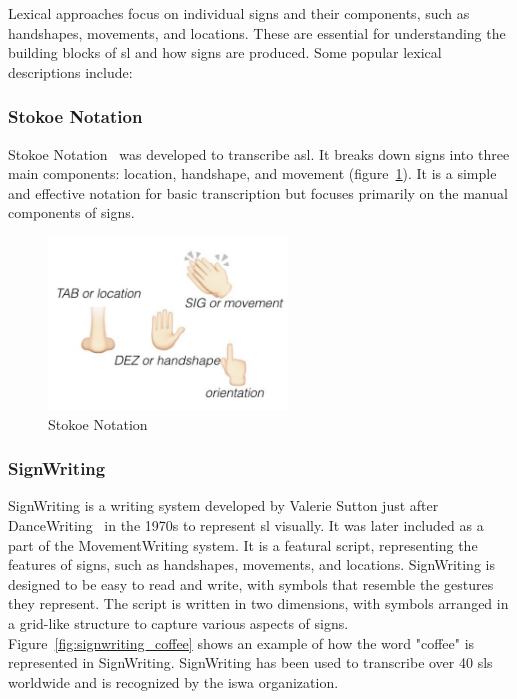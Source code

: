 \documentclass[../../main.tex]{subfiles}
\begin{document}
Lexical approaches focus on individual signs and their components, such as handshapes, movements, and locations. These are essential for understanding the building blocks of \gls{sl} and how signs are produced. Some popular lexical descriptions include:

\subsubsection{Stokoe Notation}
\label{ch:background_work:sign_language_descriptions:lexical_approaches:stokoe_notation}

Stokoe Notation~\cite{stokoe1980sign} was developed to transcribe \gls{asl}. It breaks down signs into three main components: location, handshape, and movement (figure~\ref{fig:stokoe}). It is a simple and effective notation for basic transcription but focuses primarily on the manual components of signs.

\begin{figure}[h]
  \centering \includegraphics[width = 2.5in]{chapters/background_work/images/stokoe.png}
  \caption{Stokoe Notation}
  \label{fig:stokoe}
\end{figure}

\subsubsection{SignWriting}
\label{ch:background_work:sign_language_descriptions:lexical_approaches:signwriting}

SignWriting is a writing system developed by Valerie Sutton just after DanceWriting~\cite{sutton1973sutton} in the 1970s to represent \gls{sl} visually. It was later included as a part of the MovementWriting system. It is a featural script, representing the features of signs, such as handshapes, movements, and locations. SignWriting is designed to be easy to read and write, with symbols that resemble the gestures they represent. The script is written in two dimensions, with symbols arranged in a grid-like structure to capture various aspects of signs. Figure~\ref{fig:signwriting_coffee} shows an example of how the word "coffee" is represented in SignWriting. SignWriting has been used to transcribe over 40 \gls{sl}s worldwide and is recognized by the \gls{iswa} organization.
\end{document}
